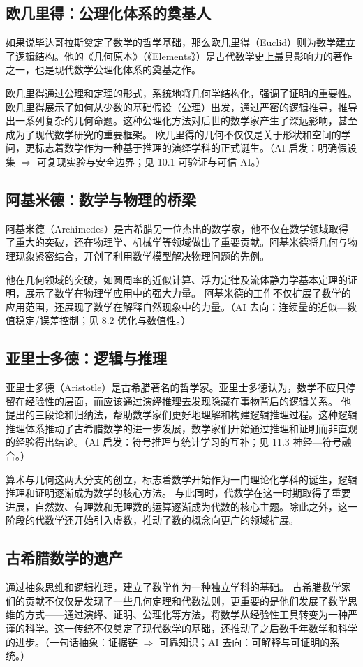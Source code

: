 \subsection{欧几里得：公理化体系的奠基人}
如果说毕达哥拉斯奠定了数学的哲学基础，那么欧几里得（Euclid）则为数学建立了逻辑结构。他的《几何原本》（《Elements》）是古代数学史上最具影响力的著作之一，也是现代数学公理化体系的奠基之作。

欧几里得通过公理和定理的形式，系统地将几何学结构化，强调了证明的重要性。欧几里得展示了如何从少数的基础假设（公理）出发，通过严密的逻辑推导，推导出一系列复杂的几何命题。这种公理化方法对后世的数学家产生了深远影响，甚至成为了现代数学研究的重要框架。
欧几里得的几何不仅仅是关于形状和空间的学问，更标志着数学作为一种基于推理的演绎学科的正式诞生。{（AI 启发：明确假设集 $\Rightarrow$ 可复现实验与安全边界；见 10.1 可验证与可信 AI。）}

\subsection{阿基米德：数学与物理的桥梁}
阿基米德（Archimedes）是古希腊另一位杰出的数学家，他不仅在数学领域取得了重大的突破，还在物理学、机械学等领域做出了重要贡献。阿基米德将几何与物理现象紧密结合，开创了利用数学模型解决物理问题的先例。

他在几何领域的突破，如圆周率的近似计算、浮力定律及流体静力学基本定理的证明，展示了数学在物理学应用中的强大力量。
阿基米德的工作不仅扩展了数学的应用范围，还展现了数学在解释自然现象中的力量。{（AI 去向：连续量的近似—数值稳定/误差控制；见 8.2 优化与数值性。）}

\subsection{亚里士多德：逻辑与推理}
亚里士多德（Aristotle）是古希腊著名的哲学家。亚里士多德认为，数学不应只停留在经验性的层面，而应该通过演绎推理去发现隐藏在事物背后的逻辑关系。
他提出的三段论和归纳法，帮助数学家们更好地理解和构建逻辑推理过程。这种逻辑推理体系推动了古希腊数学的进一步发展，数学家们开始通过推理和证明而非直观的经验得出结论。{（AI 启发：符号推理与统计学习的互补；见 11.3 神经—符号融合。）}

算术与几何这两大分支的创立，标志着数学开始作为一门理论化学科的诞生，逻辑推理和证明逐渐成为数学的核心方法。
与此同时，代数学在这一时期取得了重要进展，自然数、有理数和无理数的运算逐渐成为代数的核心主题。除此之外，这一阶段的代数学还开始引入虚数，推动了数的概念向更广的领域扩展。

\subsection{古希腊数学的遗产}
通过抽象思维和逻辑推理，建立了数学作为一种独立学科的基础。
古希腊数学家们的贡献不仅仅是发现了一些几何定理和代数法则，更重要的是他们发展了数学思维的方式——通过演绎、证明、公理化等方法，将数学从经验性工具转变为一种严谨的科学。这一传统不仅奠定了现代数学的基础，还推动了之后数千年数学和科学的进步。{（一句话抽象：证据链 $\Rightarrow$ 可靠知识；AI 去向：可解释与可证明的系统。）}

